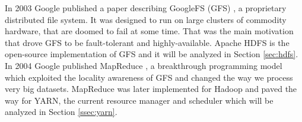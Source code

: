 In 2003 Google published a paper describing GoogleFS (GFS)
\cite{Ghemawat:2003:GFS:1165389.945450}, a proprietary distributed
file system. It was designed to run on large clusters of commodity
hardware, that are doomed to fail at some time. That was the main
motivation that drove GFS to be fault-tolerant and
highly-available. Apache HDFS is the open-source implementation of GFS
and it will be analyzed in Section \ref{sec:hdfs}. In 2004 Google
published MapReduce \cite{Dean:2004:MSD:1251254.1251264}, a breakthrough programming model which exploited the locality
awareness of GFS and changed the way we process very big
datasets. MapReduce was later implemented for Hadoop and paved the way
for YARN, the current resource manager and scheduler 
which will be analyzed in Section \ref{ssec:yarn}.
